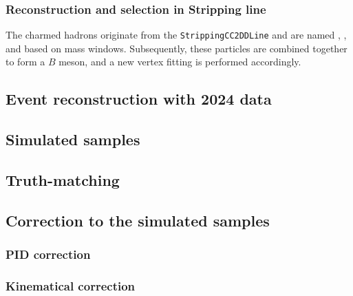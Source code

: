 \subsubsection{Reconstruction and selection in Stripping line}
\label{sec:stripping}
%
The charmed hadrons originate from the \texttt{StrippingCC2DDLine} and are named \Dm, \Dsm, \Xicbarm and \Lc based on mass windows. Subsequently, these particles are combined together to form a $B$ meson, and a new vertex fitting is performed accordingly.

\subsection{Event reconstruction with 2024 data}


\subsection{Simulated samples}

\subsection{Truth-matching}
\subsection{Correction to the simulated samples}

\subsubsection{PID correction}


\subsubsection{Kinematical correction }